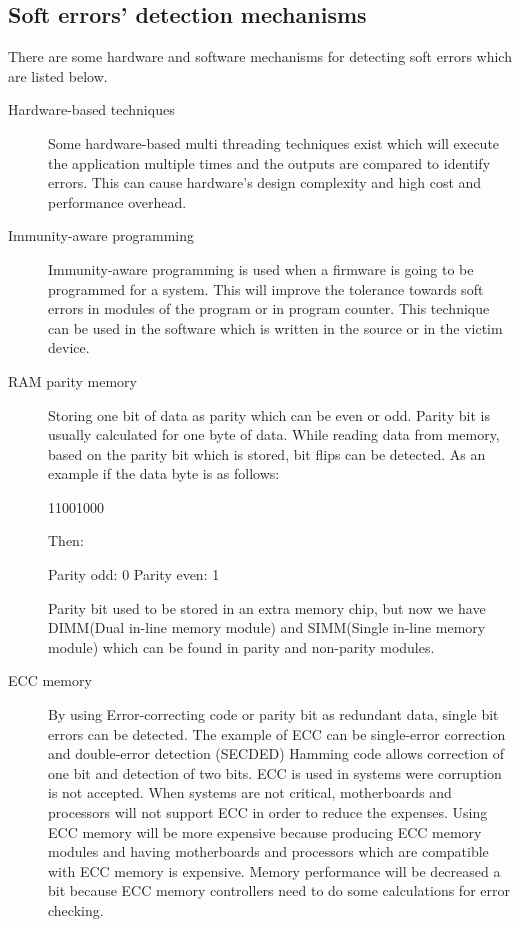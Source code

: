 \documentclass{report}
\begin{document}
\subsection{Soft errors' detection mechanisms}

There are some hardware and software mechanisms for detecting soft errors which are listed below.
\begin{description}

\item[Hardware-based techniques] Some hardware-based multi threading techniques \cite{reinhardt,mukherjee,vijaykumar} exist which will execute the application multiple times and the outputs are compared to identify errors. This can cause hardware's design complexity and high cost and performance overhead. \cite{soft} 

\item [Immunity-aware programming] Immunity-aware programming is used when a firmware is going to be programmed for a system. This will improve the tolerance towards soft errors in modules of the program or in program counter. This technique can be used in the software which is written in the source or in the victim device. \cite{immune}

\item [RAM parity memory]  Storing one bit of data as parity which can be even or odd. Parity bit is usually calculated for one byte of data. While reading data from memory, based on the parity bit which is stored, bit flips can be detected. As an example if the data byte is as follows:

11001000

Then:

Parity odd:  0
Parity even: 1

Parity bit used to be stored in an extra memory chip, but now we have DIMM(Dual in-line memory module) and SIMM(Single in-line memory module) which can be found in parity and non-parity modules.\cite{ramparity}

\item [ECC memory] By using Error-correcting code or parity bit as redundant data, single bit errors can be detected. The example of ECC can be single-error correction and double-error detection (SECDED) Hamming code allows correction of one bit and detection of two bits. ECC is used in systems were corruption is not accepted. When systems are not critical, motherboards and processors will not support ECC in order to reduce the expenses. Using ECC memory will be more expensive because producing ECC memory modules and having motherboards and processors which are compatible with ECC memory is expensive. Memory performance will be decreased a bit because ECC memory controllers need to do some calculations for error checking. \cite{eccmemory}

\end{description}
\end{document}
